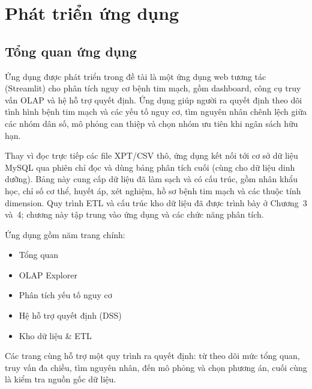 \chapter{Phát triển ứng dụng}\label{ch:app}

\section{Tổng quan ứng dụng}
Ứng dụng được phát triển trong đề tài là một ứng dụng web tương tác (Streamlit) cho phân tích nguy cơ bệnh tim mạch, gồm dashboard, công cụ truy vấn OLAP và hệ hỗ trợ quyết định. Ứng dụng giúp người ra quyết định theo dõi tình hình bệnh tim mạch và các yếu tố nguy cơ, tìm nguyên nhân chênh lệch giữa các nhóm dân số, mô phỏng can thiệp và chọn nhóm ưu tiên khi ngân sách hữu hạn.

Thay vì đọc trực tiếp các file XPT/CSV thô, ứng dụng kết nối tới cơ sở dữ liệu MySQL qua phiên chỉ đọc và dùng bảng phân tích cuối  (cùng  cho dữ liệu dinh dưỡng). Bảng này cung cấp dữ liệu đã làm sạch và có cấu trúc, gồm nhân khẩu học, chỉ số cơ thể, huyết áp, xét nghiệm, hồ sơ bệnh tim mạch và các thuộc tính dimension. Quy trình ETL và cấu trúc kho dữ liệu đã được trình bày ở Chương~3 và~4; chương này tập trung vào ứng dụng và các chức năng phân tích.

Ứng dụng gồm năm trang chính:
\begin{itemize}
\item Tổng quan
\item OLAP Explorer
\item Phân tích yếu tố nguy cơ
\item Hệ hỗ trợ quyết định (DSS)
\item Kho dữ liệu \& ETL
\end{itemize}
Các trang cùng hỗ trợ một quy trình ra quyết định: từ theo dõi mức tổng quan, truy vấn đa chiều, tìm nguyên nhân, đến mô phỏng và chọn phương án, cuối cùng là kiểm tra nguồn gốc dữ liệu.

